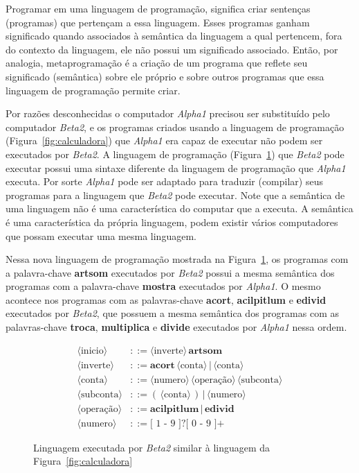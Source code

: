 Programar em uma linguagem de programação, significa criar sentenças (programas) que pertençam a essa linguagem. Esses programas ganham significado quando associados à semântica da linguagem a qual pertencem, fora do contexto da linguagem, ele não possui um significado associado. Então, por analogia, metaprogramação é a criação de um programa que reflete seu significado (semântica) sobre ele próprio e sobre outros programas que essa linguagem de programação permite criar.

Por razões desconhecidas o computador \emph{Alpha1} precisou ser substituído pelo computador \emph{Beta2}, e os programas criados usando a linguagem de programação (Figura~\ref{fig:calculadora}) que \emph{Alpha1} era capaz de executar não podem ser executados por  \emph{Beta2}. A linguagem de programação (Figura~\ref{fig:calculadoraalien}) que \emph{Beta2} pode executar possui uma sintaxe diferente da linguagem de programação que \emph{Alpha1} executa. Por sorte \emph{Alpha1} pode ser adaptado para traduzir (compilar) seus programas para a linguagem que \emph{Beta2} pode executar. Note que a semântica de uma linguagem não é uma característica do computar que a executa. A semântica é uma característica da própria linguagem, podem existir vários computadores que possam executar uma mesma linguagem.

Nessa nova linguagem de programação mostrada na Figura~\ref{fig:calculadoraalien}, os programas com a palavra-chave \textbf{artsom} executados por \emph{Beta2} possui a mesma semântica dos programas com a palavra-chave \textbf{mostra} executados por \emph{Alpha1}. O mesmo acontece nos programas com as palavras-chave \textbf{acort}, \textbf{acilpitlum} e \textbf{edivid} executados por \emph{Beta2}, que possuem a mesma semântica dos programas com as palavras-chave \textbf{troca}, \textbf{multiplica} e \textbf{divide} executados por \emph{Alpha1} nessa ordem.

\begin{figure}[H]
\begin{framed}
\begin{center}
\begin{align*}
\langle \text{inicio} \rangle &::= \langle \text{inverte} \rangle \, \mathbf{artsom}\\	
\langle \text{inverte} \rangle &::= \mathbf{acort} \, \langle \text{conta} \rangle \, | \, \langle \text{conta} \rangle\\
\langle \text{conta} \rangle &::= \langle \text{numero} \rangle \, \langle \text{operação} \rangle \, \langle \text{subconta} \rangle\\
\langle \text{subconta} \rangle &::= ( \, \langle \text{conta} \rangle \, ) \, | \, \langle \text{numero} \rangle\\
\langle \text{operação} \rangle &::= \mathbf{acilpitlum} \, | \, \mathbf{edivid}\\
\langle \text{numero} \rangle &::= \text{[ 1 - 9 ]?[ 0 - 9 ]+}
\end{align*}
\end{center}
\end{framed} 
\caption{Linguagem executada por \emph{Beta2} similar à linguagem da Figura~\ref{fig:calculadora} }
\label{fig:calculadoraalien}
\end{figure} 

